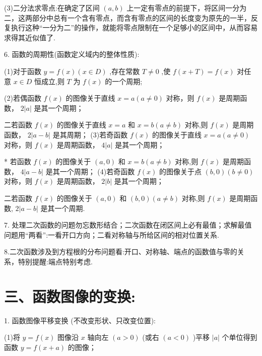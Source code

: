 (3)二分法求零点:在确定了区间 $\left( {a,b}\right)$ 上一定有零点的前提下，将区间一分为二，这两部分中总有一个含有零点，而含有零点的区间的长度变为原先的一半，反复执行这种“一分为二”的操作，就能将零点限制在一个足够小的区间中，从而容易求得其近似值了.

6. 函数的周期性(函数定义域内的整体性质):

(1)对于函数 $y = f\left( x\right) \left( {x \in  D}\right)$ ,存在常数 $T \neq  0$ ,使 $f\left( {x + T}\right)  = f\left( x\right)$ 对任意 $x \in  D$ 恒成立,则 $T$ 为 $f\left( x\right)$ 的一个周期;

(2)若偶函数 $f\left( x\right)$ 的图像关于直线 $x = a\left( {a \neq  0}\right)$ 对称，则 $f\left( x\right)$ 是周期函数， $2\left| a\right|$ 是其一个周期；

二若函数 $f\left( x\right)$ 的图像关于直线 $x = a$ 和 $x = b\left( {a \neq  b}\right)$ 对称,则 $f\left( x\right)$ 是周期函数， $2\left| {a - b}\right|$ 是其周期； (3)若奇函数 $f\left( x\right)$ 的图像关于直线 $x = a\left( {a \neq  0}\right)$ 对称，则 $f\left( x\right)$ 是周期函数， $4\left| a\right|$ 是其一个周期；

* 若函数 $f\left( x\right)$ 的图像关于 $\left( {a,0}\right)$ 和 $x = b\left( {a \neq  b}\right)$ 对称,则 $f\left( x\right)$ 是周期函数， $4\left| {a - b}\right|$ 是其一个周期； (4)若奇函数 $f\left( x\right)$ 的图像关于点 $\left( {b,0}\right) \left( {b \neq  0}\right)$ 对称，则 $f\left( x\right)$ 是周期函数， $2\left| b\right|$ 是其一个周期；

二若函数 $f\left( x\right)$ 的图像关于 $\left( {a,0}\right)$ 和 $\left( {b,0}\right) \left( {a \neq  b}\right)$ 对称,则 $f\left( x\right)$ 是周期函数, $2\left| {a - b}\right|$ 是其一个周期.

7. 处理二次函数的问题勿忘数形结合；二次函数在闭区间上必有最值；求解最值问题用“两看”:一看开口方向；二看对称轴与所给区间的相对位置关系.

8.二次函数涉及到方程根的分布问题看:开口、对称轴、端点的函数值与零的关系，特别提醒:端点特别考虑.

\section*{三、函数图像的变换:}

1. 函数图像平移变换 (不改变形状、只改变位置):

(1)将 $y = f\left( x\right)$ 图像沿 $x$ 轴向左 $\left( {a > 0}\right)$ (或右 $\left( {a < 0}\right)$ )平移 $\left| a\right|$ 个单位得到函数 $y = f\left( {x + a}\right)$ 的图像；

